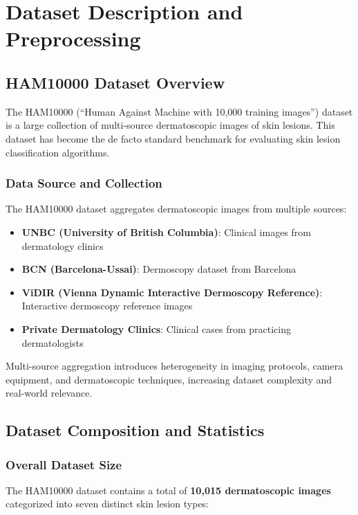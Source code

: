 \chapter{Dataset Description and Preprocessing}
\label{ch:dataset}

\section{HAM10000 Dataset Overview}

The HAM10000 (``Human Against Machine with 10,000 training images'') dataset is a large collection of multi-source dermatoscopic images of skin lesions. This dataset has become the de facto standard benchmark for evaluating skin lesion classification algorithms.

\subsection{Data Source and Collection}

The HAM10000 dataset aggregates dermatoscopic images from multiple sources:

\begin{itemize}
    \item \textbf{UNBC (University of British Columbia)}: Clinical images from dermatology clinics
    \item \textbf{BCN (Barcelona-Ussai)}: Dermoscopy dataset from Barcelona
    \item \textbf{ViDIR (Vienna Dynamic Interactive Dermoscopy Reference)}: Interactive dermoscopy reference images
    \item \textbf{Private Dermatology Clinics}: Clinical cases from practicing dermatologists
\end{itemize}

Multi-source aggregation introduces heterogeneity in imaging protocols, camera equipment, and dermatoscopic techniques, increasing dataset complexity and real-world relevance.

\section{Dataset Composition and Statistics}

\subsection{Overall Dataset Size}

The HAM10000 dataset contains a total of \textbf{10,015 dermatoscopic images} categorized into seven distinct skin lesion types:

